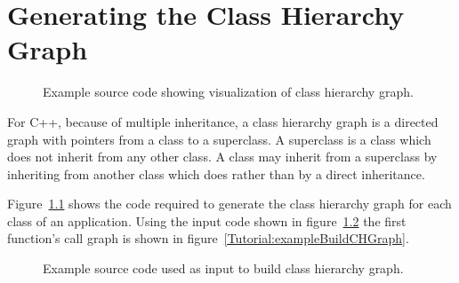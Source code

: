 \chapter{Generating the Class Hierarchy Graph}

\begin{figure}[!h]
{\indent
{\mySmallFontSize

\label{Tutorial:exampleBuildCH}

\begin{latexonly}
   
\end{latexonly}

\begin{htmlonly}
   
\end{htmlonly}

}
}
\caption{Example source code showing visualization of class hierarchy graph.}
\end{figure}

For C++, because of multiple inheritance, a class hierarchy graph is a directed graph 
with pointers from a class to a superclass. A superclass is a class which does not inherit
from any other class. A class may inherit from a superclass by inheriting from another
class which does rather than by a direct inheritance.

Figure~\ref{Tutorial:exampleBuildCH} shows the code required to generate
the class hierarchy graph for each class of an application.  Using the input code shown in
figure~\ref{Tutorial:exampleInputCode_BuildCH} the first function's call graph is
shown in figure~\ref{Tutorial:exampleBuildCHGraph}.

\begin{figure}[!h]
{\indent
{\mySmallFontSize

\label{Tutorial:exampleInputCode_BuildCH}

\begin{latexonly}
   
\end{latexonly}

\begin{htmlonly}
   
\end{htmlonly}

}
}
\caption{Example source code used as input to build class hierarchy graph.}
\end{figure}


